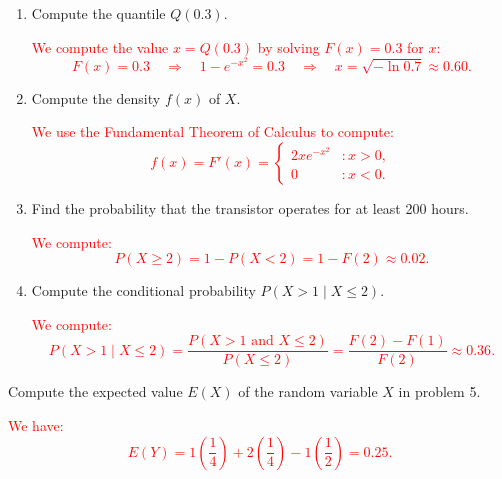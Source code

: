 \documentclass[12pt,reqno]{amsart}
\begin{document}
\medskip
\begin{enumerate}
    \item Compute the quantile $Q(0.3)$.
    
    \bigskip
    \textcolor{red}{We compute the value $x = Q(0.3)$ by solving $F(x) = 0.3$ for $x$:
        \[F(x) = 0.3 \quad \Rightarrow \quad 1 - e^{-x^2} = 0.3 \quad \Rightarrow \quad x = \sqrt{-\ln{0.7}} \approx 0.60.\]}
    \bigskip

    \item Compute the density $f(x)$ of $X$.
    
    \bigskip
    \textcolor{red}{We use the Fundamental Theorem of Calculus to compute:
        \[f(x) = F'(x) = \begin{cases}
            2xe^{-x^2} & : x>0, \\
            0 & : x<0.
        \end{cases}\]}
    \bigskip

    \item Find the probability that the transistor operates for at least 200 hours.
    
    \bigskip
    \textcolor{red}{We compute:
        \[P(X\geq 2) = 1 - P(X<2) = 1- F(2) \approx 0.02.\]}
    \bigskip

    \item Compute the conditional probability $P(X>1 \mid X\leq 2)$.
    
    \bigskip
    \textcolor{red}{We compute:
        \[P(X>1 \mid X\leq 2) = \frac{P(X>1 \text{ and } X\leq 2)}{P(X\leq 2)} = \frac{F(2)-F(1)}{F(2)} \approx 0.36.  \]}
    \bigskip
\end{enumerate}



















\bigskip
\prob Compute the expected value $E(X)$ of the random variable $X$ in problem 5.

\bigskip
\textcolor{red}{We have:
    \[E(Y) = 1\left( \frac{1}{4} \right) + 2\left( \frac{1}{4} \right) - 1 \left( \frac{1}{2} \right) = 0.25.\]}
\end{document}
